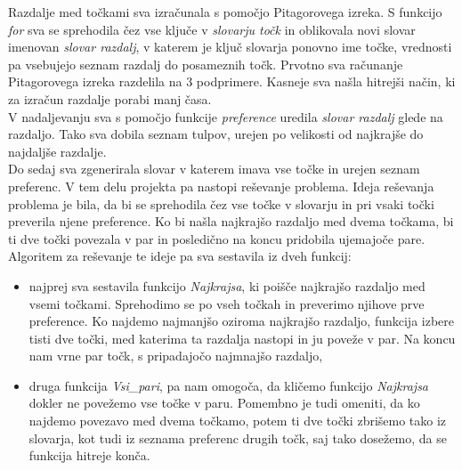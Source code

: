 \documentclass[12pt, a4paper]{article}
\begin{document}
Razdalje med točkami sva izračunala s pomočjo Pitagorovega izreka. S funkcijo \textit{for} sva se sprehodila čez vse ključe v \textit{slovarju točk} in oblikovala novi slovar imenovan \textit{slovar razdalj}, v katerem je ključ slovarja ponovno ime točke, vrednosti pa vsebujejo seznam razdalj do posameznih točk. Prvotno sva računanje Pitagorovega izreka  razdelila na 3 podprimere. Kasneje sva našla hitrejši način, ki za izračun razdalje porabi manj časa.\\
V nadaljevanju sva s pomočjo funkcije \textit{preference} uredila \textit{slovar razdalj} glede na razdaljo. Tako sva dobila seznam tulpov, urejen po velikosti od najkrajše do najdaljše razdalje.  \\

Do sedaj sva zgenerirala slovar v katerem imava vse točke in urejen seznam preferenc.  V tem delu projekta pa nastopi reševanje problema. Ideja reševanja problema je bila, da bi se sprehodila čez vse točke v slovarju in pri vsaki točki preverila njene preference. Ko bi našla najkrajšo razdaljo med dvema točkama, bi ti dve točki povezala v par in posledično na koncu pridobila ujemajoče pare. Algoritem za reševanje te ideje pa sva sestavila iz dveh funkcij:
\begin{itemize}
	\item najprej sva sestavila funkcijo \textit{Najkrajsa}, ki poišče najkrajšo razdaljo med vsemi točkami. Sprehodimo se po vseh točkah in preverimo njihove prve preference. Ko najdemo najmanjšo oziroma najkrajšo razdaljo, funkcija izbere tisti dve točki, med katerima ta razdalja nastopi in ju poveže v par. Na koncu nam vrne par točk, s pripadajočo najmnajšo razdaljo,
	\item druga funkcija \textit{Vsi_pari}, pa nam omogoča, da kličemo funkcijo \textit{Najkrajsa} dokler ne povežemo vse točke v paru. Pomembno je tudi omeniti, da ko najdemo povezavo med dvema točkamo, potem ti dve točki zbrišemo tako iz slovarja, kot tudi iz seznama preferenc drugih točk, saj tako dosežemo, da se funkcija hitreje konča.
\end{itemize}

\pagebreak
\end{document}
